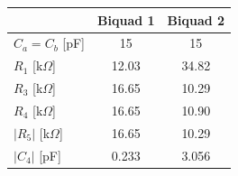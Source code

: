 \begin{tabular}{lcc}
\toprule
 & Biquad 1 & Biquad 2 \\
\midrule
$C_a=C_b$ [pF] & 15 & 15 \\
$R_1$ [k$\Omega$] & 12.03 & 34.82 \\
$R_3$ [k$\Omega$] & 16.65 & 10.29 \\
$R_4$ [k$\Omega$] & 16.65 & 10.90 \\
$|R_5|$ [k$\Omega$] & 16.65 & 10.29 \\
$|C_4|$ [pF] & 0.233 & 3.056 \\
\bottomrule
\end{tabular}